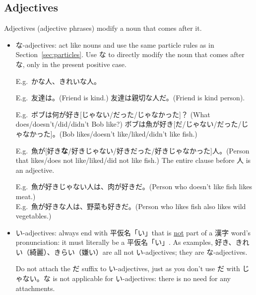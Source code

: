 \documentclass[../nihongo-gakushuu-kyouzai.tex]{subfiles}
\begin{document}
\subsection{Adjectives}
Adjectives (adjective phrases) modify a noun that comes after it.
\begin{itemize}
    \item な-adjectives: act like nouns and use the same particle rules as in Section~\ref{sec:particles}. Use な to directly modify the noun that comes after な, only in the present positive case.


    E.g.\ かな人、きれいな人。

    E.g.\ 友達は。(Friend is kind.) 友達は親切な人だ。(Friend is kind person).

    E.g.\ ボブは何が好き[じゃない/だった/じゃなかった]？ (What does/doesn't/did/didn't Bob like?) ボブは魚が好き[だ/じゃない/だった/じゃなかった]。(Bob likes/doesn't like/liked/didn't like fish.)

    E.g.\ 魚が[好き\textbf{な}/好きじゃない/好きだった/好きじゃなかった]人。(Person that likes/does not like/liked/did not like fish.) The entire clause before 人 is an adjective.

    E.g.\ 魚が好きじゃない人は、肉が好きだ。(Person who doesn't like fish likes meat.)\\
    E.g.\ 魚が好きな人は、野菜も好きだ。(Person who likes fish also likes wild vegetables.)

    \item い-adjectives: always end with 平仮名「い」that is \ul{not} part of a 漢字 word's pronunciation: it must literally be a 平仮名「い」. As examples, 好き、きれい（綺麗）、きらい（嫌い）are all not い-adjectives; they are な-adjectives. 


    Do not attach the だ suffix to い-adjectives, just as you don't use だ with じゃない。な is not applicable for い-adjectives: there is no need for any attachments.


\end{itemize}
\end{document}
